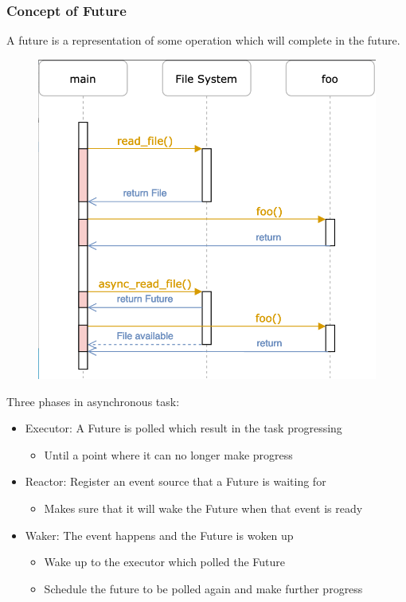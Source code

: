 \begin{frame}[fragile]
    \frametitle{Concept of Future}
% 
% 
A future is a representation of some operation which will complete in the future.
% 
    \begin{figure}
    \includegraphics[width=0.8\linewidth]{figs/async-example.png}
    \end{figure}
% 
Three phases in asynchronous task:
% 
    \begin{itemize}
        \item {\color{red}Executor}: A Future is polled which result in the task progressing
    	\begin{itemize}
    	    \item Until a point where it can no longer make progress
    	\end{itemize}
        \item {\color{red}Reactor}: Register an event source that a Future is waiting for
    	\begin{itemize}
    	    \item Makes sure that it will wake the Future when that event is ready
    	\end{itemize}
        \item {\color{red}Waker}: The event happens and the Future is woken up
    	\begin{itemize}
    	    \item Wake up to the executor which polled the Future
    	    \item Schedule the future to be polled again and make further progress
    	\end{itemize}
    \end{itemize}
% 
\end{frame}
